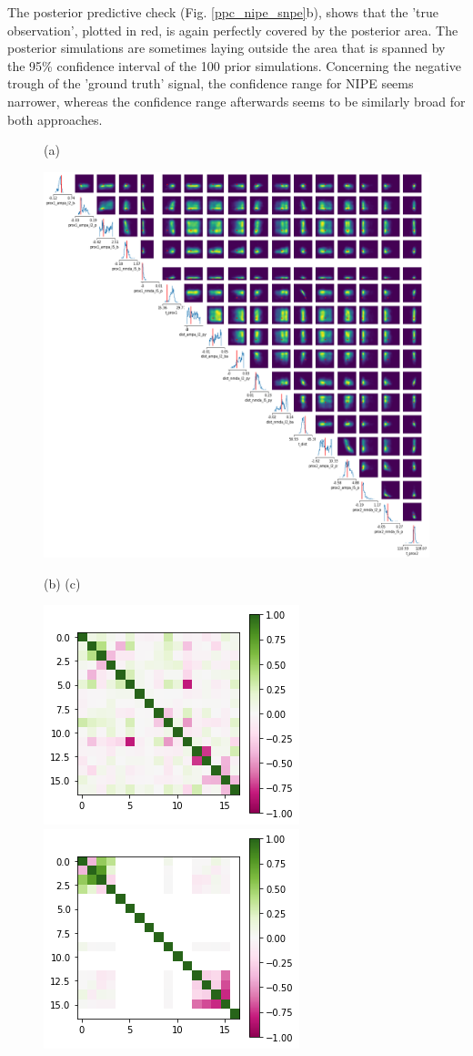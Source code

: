 \documentclass[12pt]{extreport}
\begin{document}
The posterior predictive check (Fig. \ref{ppc_nipe_snpe}b), shows that the 'true observation', plotted in red, is again perfectly covered by the posterior area. The posterior simulations are sometimes laying outside the area that is spanned by the 95\% confidence interval of the 100 prior simulations. Concerning the negative trough of the 'ground truth' signal, the confidence range for NIPE seems narrower, whereas the confidence range afterwards seems to be similarly broad for both approaches.\\


 \begin{figure}
 \centering

    \begin{minipage}{15cm}
        \small (a)  
    \end{minipage}
        \includegraphics[width=0.92\linewidth]{images/kde_1000sims.png}
        
    \begin{minipage}{13cm}
        \small (b)  \hspace{6cm} \small (c)
    \end{minipage}  
        \includegraphics[width=0.37\linewidth]{images/thesis_fig4_8b.png}
        \includegraphics[width=0.37\linewidth]{images/thesis_fig4_8c.png}



\end{figure}
\end{document}

